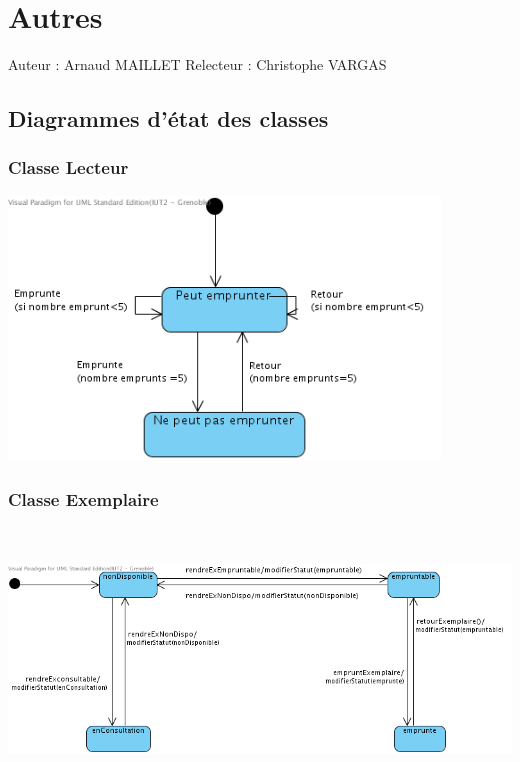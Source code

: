 \documentclass[a4paper,10pt]{report}
\begin{document}
\newpage

\chapter*{Autres}

Auteur : Arnaud MAILLET
Relecteur : Christophe VARGAS

\bigskip

\section*{Diagrammes d'état des classes}

\subsection*{Classe Lecteur}
\bigskip
\includegraphics[height=70mm]{ETLecteur.png}

\subsection*{Classe Exemplaire}
\bigskip
\includegraphics[height=70mm]{ETExemplaire.png}
\newpage
\end{document}
